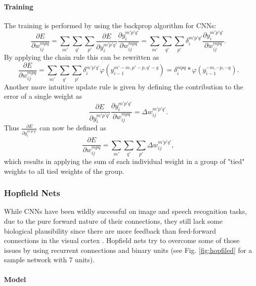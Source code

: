 \paragraph{Training} \label{c:cnntraining}


The training is performed by using the backprop algorithm for CNNs:
\[
\frac{\partial E}{\partial w_{ij}^{mpq}} = \sum_{m'} \sum_ {q'}  \sum_{p'} \frac{\partial E}{\partial y_i^{m' p' q'}}  \frac{\partial y_i^{m' p' q'}}{\partial w_{ij}^{mpq}}  = \sum_{m'} \sum_ {q'}  \sum_{p'} \delta_i^{m' p' q'}  \frac{\partial y_i^{m' p' q'}}{\partial w_{ij}^{mpq}}.
\] 
By applying the chain rule this can be rewritten as
\[
\frac{\partial E}{\partial w_{ij}^{mpq}} = \sum_{m'} \sum_ {q'}  \sum_{p'} \delta_i^{m' p' q'}  \varphi(y_{i-1}^{m'-m, p'-p, q'-q}) = \delta_i^{m p q}  * \varphi(y_{i-1}^{-m, -p, -q}).
\] 
Another more intuitive update rule is given by defining the contribution to the error of a single weight as
\[
\frac{\partial E}{\partial y_i^{m' p' q'}}  \frac{\partial y_i^{m' p' q'}}{\partial w_{ij}^{mpq}}  = \Delta w_{ij}^{m' p' q'}.
\] 
Thus $\frac{\partial E}{\partial y_i^{m' p' q'}}$ can now be defined as
\[
\frac{\partial E}{\partial w_{ij}^{mpq}} = \sum_{m'} \sum_ {q'}  \sum_{p'} \Delta w_{ij}^{m' p' q'},
\] 
which results in applying the sum of each individual weight in a group of "tied" weights to all tied weights of the group.



\subsubsection{Hopfield Nets} \label{c:hopnets}

While CNNs have been wildly successful on image and speech recognition tasks, due to the pure forward nature of their connections, they still lack some biological plausibility since there are more feedback than feed-forward connections in the visual cortex \cite{sillito2006always}.
Hopfield nets try to overcome some of those issues by using recurrent connections and binary units \cite{Goodfellow-et-al-2016-Book, hopfield1982neural} (see Fig. \ref{fig:hopfiled} for a sample network with 7 units).

\paragraph{Model} \label{c:hopmodel}

